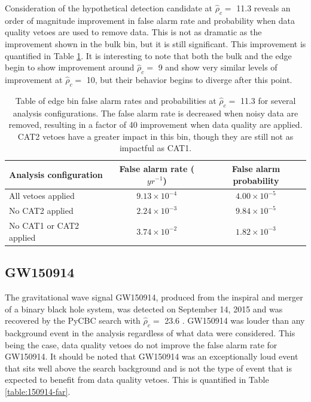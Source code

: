 Consideration of the hypothetical detection candidate at $\hat{\rho}_{c} =$ 11.3 reveals an
order of magnitude improvement
in false alarm rate and probability when data quality vetoes are used to remove data.
This is not as dramatic as
the improvement shown in the bulk bin, but it is still significant. This improvement is
quantified in Table \ref{table:edge-far}. It is interesting to note
that both the bulk and the edge begin to show improvement around $\hat{\rho}_{c} =$ 9 and
show very similar levels
of improvement at $\hat{\rho}_{c} =$ 10, but their behavior begins to diverge after this point.

\begin{table}[!ht]%
  \begin{center}
    \begin{tabular}{lcc}
      \hline
      Analysis configuration & False alarm rate ($yr^{-1}$) & False alarm probability \\ \hline
      All vetoes applied & $9.13\times10^{-4}$ & $4.00\times10^{-5}$ \\
      No CAT2 applied & $2.24\times10^{-3}$ & $9.84\times10^{-5}$ \\
      No CAT1 or CAT2 applied & $3.74\times10^{-2}$ & $1.82\times10^{-3}$ \\
      \hline
    \end{tabular}
  \end{center}
  \caption[Edge bin FAR - GW150914 analysis]{Table of edge bin false alarm rates and probabilities at $\hat{\rho}_{c} =$ 11.3 %
           for several analysis configurations. %
           The false alarm rate is decreased when noisy data are removed, %
           resulting in a factor of 40 improvement when data quality are applied. CAT2 vetoes have a %
           greater impact in this bin, though they are still not as impactful as CAT1.}
  \label{table:edge-far}
\end{table}

\subsection{GW150914}

The gravitational wave signal GW150914, produced from the inspiral and merger of a binary black
hole system, was detected on September 14, 2015 and was recovered by the PyCBC search with
$\hat{\rho}_{c} =$ 23.6 \cite{GW150914-DETECTION}.
GW150914 was louder than
any background event in the analysis regardless of what data were considered. This being
the case, data quality vetoes do not improve the false alarm rate for GW150914. It should be
noted that GW150914 was an exceptionally loud event that sits well above the search background
and is not the type of event that is expected to benefit from data quality vetoes.
This is quantified in Table \ref{table:150914-far}.

